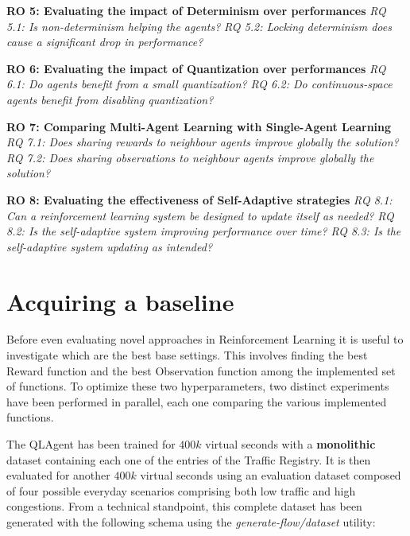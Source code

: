 \hfill \break
\noindent
\textbf{\hypertarget{ro5}{RO 5}: Evaluating the impact of Determinism over performances}
\hfill \break
\textit{\hypertarget{rq5.1}{RQ 5.1}: Is non-determinism helping the agents?}
\hfill \break
\textit{\hypertarget{rq5.2}{RQ 5.2}: Locking determinism does cause a significant drop in performance?}

\hfill \break
\noindent
\textbf{\hypertarget{ro6}{RO 6}: Evaluating the impact of Quantization over performances}
\hfill \break
\textit{\hypertarget{rq6.1}{RQ 6.1}: Do agents benefit from a small quantization?}
\hfill \break
\textit{\hypertarget{rq6.2}{RQ 6.2}: Do continuous-space agents benefit from disabling quantization?}

\hfill \break
\noindent
\textbf{\hypertarget{ro7}{RO 7}: Comparing Multi-Agent Learning with Single-Agent Learning}
\hfill \break
\textit{\hypertarget{rq7.1}{RQ 7.1}: Does sharing rewards to neighbour agents improve globally the solution?}
\hfill \break
\textit{\hypertarget{rq7.2}{RQ 7.2}: Does sharing observations to neighbour agents improve globally the solution?}

\hfill \break
\noindent
\textbf{\hypertarget{ro8}{RO 8}: Evaluating the effectiveness of Self-Adaptive strategies}
\hfill \break
\textit{\hypertarget{rq8.1}{RQ 8.1}: Can a reinforcement learning system be designed to update itself as needed?}
\hfill \break
\textit{\hypertarget{rq8.2}{RQ 8.2}: Is the self-adaptive system improving performance over time?}
\hfill \break
\textit{\hypertarget{rq8.3}{RQ 8.3}: Is the self-adaptive system updating as intended?}

\section{Acquiring a baseline}
  
  Before even evaluating novel approaches in Reinforcement Learning it is useful to investigate which are the best base settings. This involves finding the best Reward function and the best Observation function among the implemented set of functions. To optimize these two hyperparameters, two distinct experiments have been performed in parallel, each one comparing the various implemented functions.

  The QLAgent has been trained for $400k$ virtual seconds with a \textbf{monolithic} dataset containing each one of the entries of the Traffic Registry. It is then evaluated for another $400k$ virtual seconds using an evaluation dataset composed of four possible everyday scenarios comprising both low traffic and high congestions. From a technical standpoint, this complete dataset has been generated with the following schema using the \textit{generate-flow/dataset} utility:

